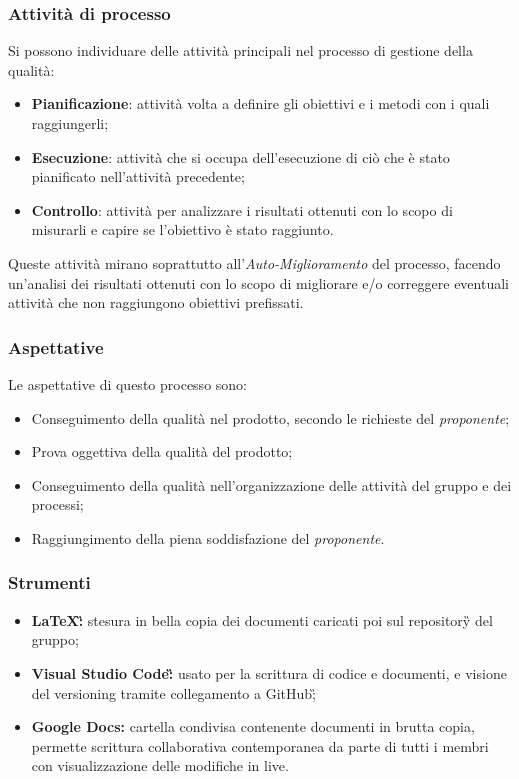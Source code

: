 			\subsubsection{Attività di processo}
				Si possono individuare delle attività principali nel processo di gestione della qualità:
				\begin{itemize}
					\item \textbf{Pianificazione}: attività volta a definire gli obiettivi e i metodi con i quali raggiungerli;
					\item \textbf{Esecuzione}: attività che si occupa dell'esecuzione di ciò che è stato pianificato nell'attività precedente;
					\item \textbf{Controllo}: attività per analizzare i risultati ottenuti con lo scopo di misurarli e capire se l'obiettivo è stato raggiunto.
				\end{itemize}
				Queste attività mirano soprattutto all'\emph{Auto-Miglioramento} del processo, facendo un'analisi dei risultati ottenuti con lo scopo di migliorare e/o correggere eventuali attività
				che non raggiungono obiettivi prefissati.
			
			\subsubsection{Aspettative}
				 Le aspettative di questo processo sono:
					\begin{itemize}
						\item Conseguimento della qualità nel prodotto, secondo le richieste del \emph{proponente};
						\item Prova oggettiva della qualità del prodotto;						
						\item Conseguimento della qualità nell'organizzazione delle attività del gruppo e dei processi;
						\item Raggiungimento della piena soddisfazione del \emph{proponente}.
					\end{itemize}

			\subsubsection{Strumenti}
			\begin{itemize}
				\item \textbf{LaTeX\G:} stesura in bella copia dei documenti caricati poi sul repository\G{} del gruppo;
				\item \textbf{Visual Studio Code\G:} usato per la scrittura di codice e documenti, e visione del versioning tramite collegamento a GitHub\G;
				\item \textbf{Google Docs:} cartella condivisa contenente documenti in brutta copia, permette scrittura collaborativa contemporanea da parte di tutti i membri con visualizzazione delle modifiche in live.
			\end{itemize}

